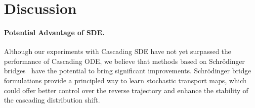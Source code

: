 \section{Discussion}
\paragraph{Potential Advantage of SDE.} Although our experiments with Cascading SDE have not yet surpassed the performance of Cascading ODE, we believe that methods based on Schrödinger bridges~\cite{de2021diffusion} have the potential to bring significant improvements. Schrödinger bridge formulations provide a principled way to learn stochastic transport maps, which could offer better control over the reverse trajectory and enhance the stability of the cascading distribution shift.